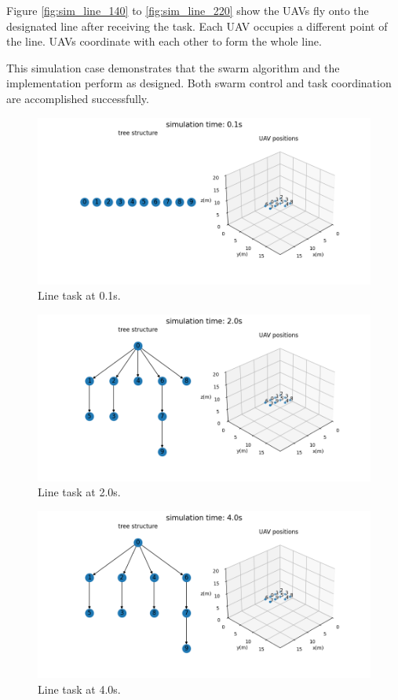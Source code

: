 Figure \ref{fig:sim_line_140} to \ref{fig:sim_line_220} show
the UAVs fly onto the designated line after receiving the task.
Each UAV occupies a different point of the line.
UAVs coordinate with each other to form the whole line.

This simulation case demonstrates that
the swarm algorithm and the implementation perform as designed.
Both swarm control and task coordination are accomplished successfully.

\begin{figure}[htbp]
  \centering
  \includegraphics[width=0.96\linewidth]{rsc/line.01.png}
  \caption{Line task at 0.1s.}
  \label{fig:sim_line_001}
\end{figure}

\begin{figure}[htbp]
  \centering
  \includegraphics[width=0.96\linewidth]{rsc/line.05.png}
  \caption{Line task at 2.0s.}
  \label{fig:sim_line_020}
\end{figure}

\begin{figure}[htbp]
  \centering
  \includegraphics[width=0.96\linewidth]{rsc/line.06.png}
  \caption{Line task at 4.0s.}
  \label{fig:sim_line_040}
\end{figure}

